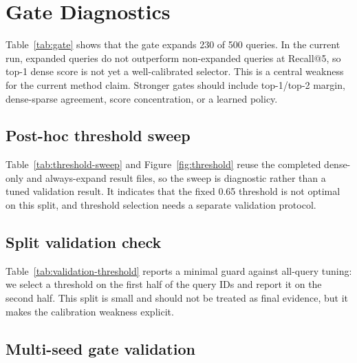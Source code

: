\documentclass[10pt,twocolumn]{article}
\begin{document}
\section{Gate Diagnostics}
\begin{table}[!tbp]
\caption{Seed-42 gate diagnostic split by expansion decision.}
\label{tab:gate}
\centering
\scriptsize

\end{table}

Table~\ref{tab:gate} shows that the gate expands 230 of
500 queries. In the current run, expanded queries do not
outperform non-expanded queries at Recall@5, so top-1 dense score is not yet a
well-calibrated selector. This is a central weakness for the current method claim.
Stronger gates should include
top-1/top-2 margin, dense-sparse agreement, score concentration, or a learned
policy.

\subsection{Post-hoc threshold sweep}
\begin{table}[!tbp]
\caption{Seed-42 post-hoc threshold sweep.}
\label{tab:threshold-sweep}
\centering
\scriptsize

\end{table}

Table~\ref{tab:threshold-sweep} and Figure~\ref{fig:threshold} reuse the
completed dense-only and always-expand result files, so the sweep is
diagnostic rather than a tuned validation result. It indicates that the fixed
0.65 threshold is not optimal on this split, and threshold selection needs a
separate validation protocol.

\subsection{Split validation check}
\begin{table}[!tbp]
\caption{Seed-42 split validation check for threshold selection.}
\label{tab:validation-threshold}
\centering
\scriptsize

\end{table}

Table~\ref{tab:validation-threshold} reports a minimal guard against all-query
tuning: we select a threshold on the first half of the query IDs and report it on the second half. This split is small and
should not be treated as final evidence, but it makes the calibration weakness
explicit.

\subsection{Multi-seed gate validation}
\begin{table}[!tbp]
\caption{Held-out gate validation over independent memory-index seeds.}
\label{tab:multiseed-gate}
\centering
\scriptsize

\end{table}
\end{document}
